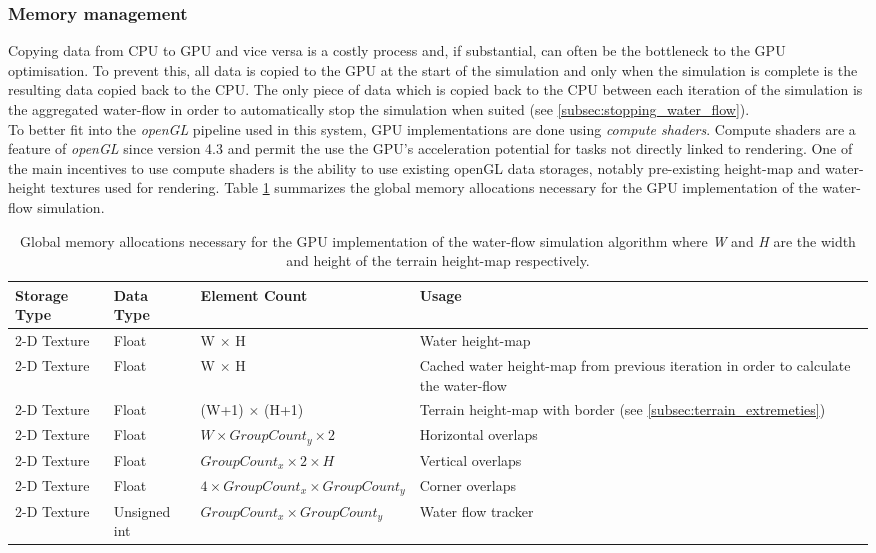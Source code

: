 \subsubsection{Memory management}

Copying data from CPU to GPU and vice versa is a costly process and, if substantial, can often be the bottleneck to the GPU optimisation. To prevent this, all data is copied to the GPU at the start of the simulation and only when the simulation is complete is the resulting data copied back to the CPU. The only piece of data which is copied back to the CPU between each iteration of the simulation is the aggregated water-flow in order to automatically stop the simulation when suited (see \ref{subsec:stopping_water_flow}).\\

To better fit into the \textit{openGL} pipeline used in this system, GPU implementations are done using \textit{compute shaders}. Compute shaders are a feature of \textit{openGL} since version 4.3 and permit the use the GPU's acceleration potential for tasks not directly linked to rendering. One of the main incentives to use compute shaders is the ability to use existing openGL data storages, notably pre-existing height-map and water-height textures used for rendering. Table \ref{tab:water_flow_simul_mem_allocs} summarizes the global memory allocations necessary for the GPU implementation of the water-flow simulation.

\begin{table}[]
  \centering
	    \begin{tabular}{|p{3cm}|p{1.5cm}|p{6cm}|p{5cm}|}
		\hline	
  	    \textbf{Storage Type} &  \textbf{Data Type} & \textbf{Element Count} & \textbf{Usage} \\
		\hline
		2-D Texture & Float & W $\times$ H & Water height-map\\
		\hline
		2-D Texture & Float & W $\times$ H & Cached water height-map from previous iteration in order to calculate the water-flow\\
		\hline
		2-D Texture & Float & (W+1) $\times$ (H+1) & Terrain height-map with border (see \ref{subsec:terrain_extremeties}) \\
		\hline
		2-D Texture & Float & $ W \times GroupCount_{y} \times 2 $ & Horizontal overlaps  \\
		\hline
		2-D Texture & Float & $ GroupCount_{x} \times 2 \times H $ & Vertical overlaps  \\
		\hline
		2-D Texture & Float & $ 4 \times GroupCount_{x} \times GroupCount_{y}$ & Corner overlaps  \\
		\hline
		2-D Texture & Unsigned int & $ GroupCount_{x} \times GroupCount_{y}$ & Water flow tracker \\
		\hline
		\end{tabular}
		\caption{Global memory allocations necessary for the GPU implementation of the water-flow simulation algorithm where \textit{W} and \textit{H} are the width and height of the terrain height-map respectively.}
	  \label{tab:water_flow_simul_mem_allocs}
\end{table}

